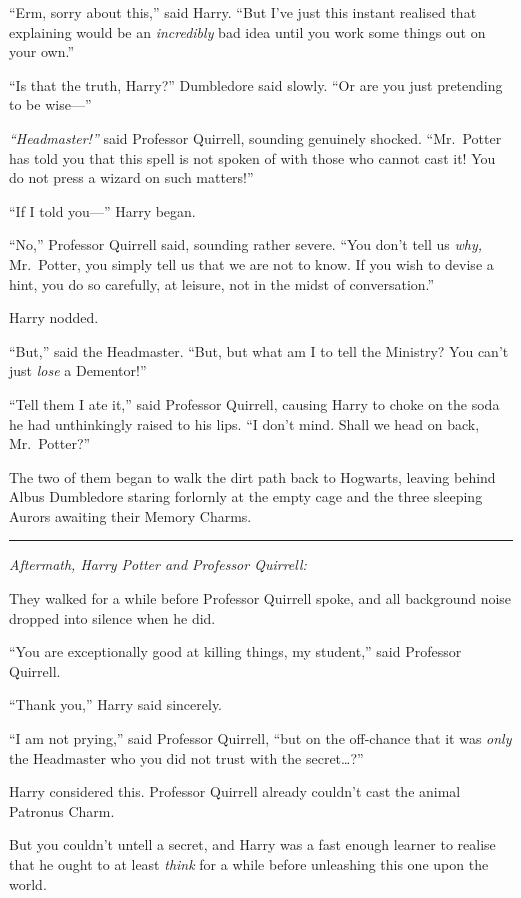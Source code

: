 ``Erm, sorry about this,'' said Harry. ``But I've just this instant
realised that explaining would be an \emph{incredibly} bad idea until
you work some things out on your own.''

``Is that the truth, Harry?'' Dumbledore said slowly. ``Or are you just
pretending to be wise---''

\emph{``Headmaster!''} said Professor Quirrell, sounding genuinely
shocked. ``Mr.~Potter has told you that this spell is not spoken of with
those who cannot cast it! You do not press a wizard on such matters!''

``If I told you---'' Harry began.

``No,'' Professor Quirrell said, sounding rather severe. ``You don't
tell us \emph{why,} Mr.~Potter, you simply tell us that we are not to
know. If you wish to devise a hint, you do so carefully, at leisure, not
in the midst of conversation.''

Harry nodded.

``But,'' said the Headmaster. ``But, but what am I to tell the Ministry?
You can't just \emph{lose} a Dementor!''

``Tell them I ate it,'' said Professor Quirrell, causing Harry to choke
on the soda he had unthinkingly raised to his lips. ``I don't mind.
Shall we head on back, Mr.~Potter?''

The two of them began to walk the dirt path back to Hogwarts, leaving
behind Albus Dumbledore staring forlornly at the empty cage and the
three sleeping Aurors awaiting their Memory Charms.

\begin{center}\rule{3in}{0.4pt}\end{center}

\emph{Aftermath, Harry Potter and Professor Quirrell:}

They walked for a while before Professor Quirrell spoke, and all
background noise dropped into silence when he did.

``You are exceptionally good at killing things, my student,'' said
Professor Quirrell.

``Thank you,'' Harry said sincerely.

``I am not prying,'' said Professor Quirrell, ``but on the off-chance
that it was \emph{only} the Headmaster who you did not trust with the
secret\ldots{}?''

Harry considered this. Professor Quirrell already couldn't cast the
animal Patronus Charm.

But you couldn't untell a secret, and Harry was a fast enough learner to
realise that he ought to at least \emph{think} for a while before
unleashing this one upon the world.

